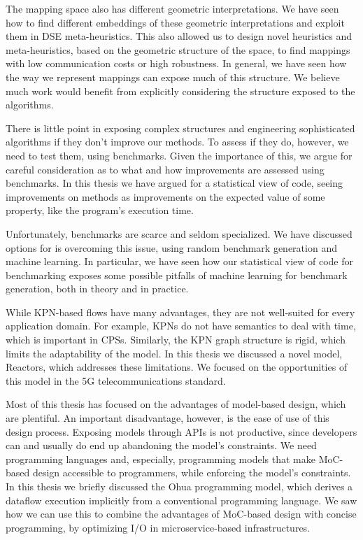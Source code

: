 The mapping space also has different geometric interpretations.
We have seen how to find different embeddings of these geometric interpretations and exploit them in \ac{DSE} meta-heuristics.
This also allowed us to design novel heuristics and meta-heuristics, based on the geometric structure of the space, to find mappings with low communication costs or high robustness.
In general, we have seen how the way we represent mappings can expose much of this structure.
We believe much work would benefit from explicitly considering the structure exposed to the algorithms.

There is little point in exposing complex structures and engineering sophisticated algorithms if they don't improve our methods.
To assess if they do, however, we need to test them, using benchmarks.
Given the importance of this, we argue for careful consideration as to what and how improvements are assessed using benchmarks.
In this thesis we have argued for a statistical view of code, seeing improvements on methods as improvements on the expected value of some property, like the program's execution time.

Unfortunately, benchmarks are scarce and seldom specialized.
We have discussed options for is overcoming this issue, using random benchmark generation and machine learning.
In particular, we have seen how our statistical view of code for benchmarking exposes some possible pitfalls of machine learning for benchmark generation, both in theory and in practice.

While \ac{KPN}-based flows have many advantages, they are not well-suited for every application domain.
For example, \acp{KPN} do not have semantics to deal with time, which is important in \acfp{CPS}.
Similarly, the \ac{KPN} graph structure is rigid, which limits the adaptability of the model.
In this thesis we discussed a novel model, Reactors, which addresses these limitations.
We focused on the opportunities of this model in the 5G telecommunications standard. 

Most of this thesis has focused on the advantages of model-based design, which are plentiful. 
An important disadvantage, however, is the ease of use of this design process.
Exposing models through \acp{API} is not productive, since developers can and usually do end up abandoning the model's constraints.
We need programming languages and, especially, programming models that make \ac{MoC}-based design accessible to programmers, while enforcing the model's constraints.
In this thesis we briefly discussed the Ohua programming model, which derives a dataflow execution implicitly from a conventional programming language. 
We saw how we can use this to combine the advantages of \ac{MoC}-based design with concise programming, by optimizing \acs{I/O} in microservice-based infrastructures.

